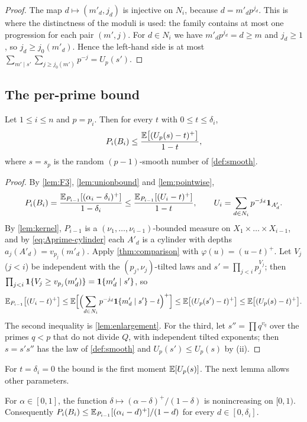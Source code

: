 \begin{proof}
The map $d\mapsto(m'_d,j_d)$ is injective on $N_i$, because $d=m'_dp^{j_d}$. This is where the distinctness of the
moduli is used: the family contains at most one progression for each pair $(m',j)$. For $d\in N_i$ we have
$m'_dp^{j_d}=d\ge m$ and $j_d\ge1$, so $j_d\ge j_0(m'_d)$. Hence the left-hand side is at most
$\sum_{m'\mid s'}\sum_{j\ge j_0(m')}p^{-j}=U_p(s')$.
\end{proof}

\subsection{The per-prime bound}

\begin{theorem}\label{thm:perprime}
Let $1\le i\le n$ and $p=p_i$. Then for every $t$ with $0\le t\le\delta_i$,
\[
  P_i(B_i)\le\frac{\mathbb{E}\bigl[(U_p(s)-t)^+\bigr]}{1-t},
\]
where $s=s_p$ is the random $(p-1)$-smooth number of \cref{def:smooth}.
\end{theorem}

\begin{proof}
By \cref{lem:F3}, \cref{lem:unionbound} and \cref{lem:pointwise},
\[
  P_i(B_i)=\frac{\mathbb{E}_{P_{i-1}}[(\alpha_i-\delta_i)^+]}{1-\delta_i}\le\frac{\mathbb{E}_{P_{i-1}}[(U_i-t)^+]}{1-t},\qquad
  U_i=\sum_{d\in N_i}p^{-j_d}\mathbf{1}_{A'_d}.
\]
By \cref{lem:kernel}, $P_{i-1}$ is a $(\nu_1,\dots,\nu_{i-1})$-bounded measure on $X_1\times\dots\times X_{i-1}$,
and by \eqref{eq:Aprime-cylinder} each $A'_d$ is a cylinder with depths $a_j(A'_d)=v_{p_j}(m'_d)$. Apply
\cref{thm:comparison} with $\varphi(u)=(u-t)^+$. Let $V_j$ ($j<i$) be independent with the $(p_j,\nu_j)$-tilted laws
and $s'=\prod_{j<i}p_j^{V_j}$; then $\prod_{j<i}\mathbf{1}\{V_j\ge v_{p_j}(m'_d)\}=\mathbf{1}\{m'_d\mid s'\}$, so
\[
  \mathbb{E}_{P_{i-1}}\bigl[(U_i-t)^+\bigr]\le\mathbb{E}\Bigl[\Bigl(\sum_{d\in N_i}p^{-j_d}\mathbf{1}\{m'_d\mid s'\}-t\Bigr)^+\Bigr]
  \le\mathbb{E}\bigl[(U_p(s')-t)^+\bigr]\le\mathbb{E}\bigl[(U_p(s)-t)^+\bigr].
\]
The second inequality is \cref{lem:enlargement}. For the third, let $s''=\prod q^{v_q}$ over the primes $q<p$ that
do not divide $Q$, with independent tilted exponents; then $s=s's''$ has the law of \cref{def:smooth} and
$U_p(s')\le U_p(s)$ by (ii).
\end{proof}

For $t=\delta_i=0$ the bound is the first moment $\mathbb{E}[U_p(s)]$. The next lemma allows other parameters.

\begin{lemma}\label{lem:delta-mono}
For $\alpha\in[0,1]$, the function $\delta\mapsto(\alpha-\delta)^+/(1-\delta)$ is nonincreasing on $[0,1)$.
Consequently $P_i(B_i)\le\mathbb{E}_{P_{i-1}}[(\alpha_i-d)^+]/(1-d)$ for every $d\in[0,\delta_i]$.
\end{lemma}

